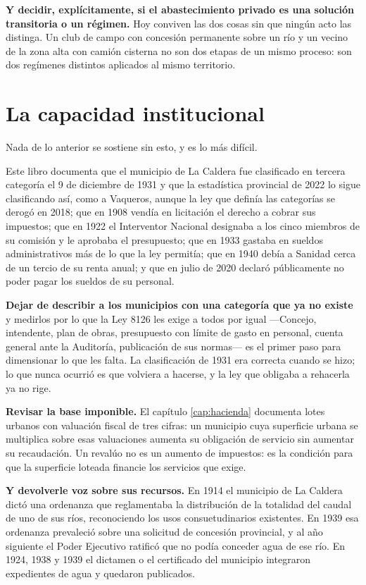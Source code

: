 \textbf{Y decidir, explícitamente, si el abastecimiento privado es una solución transitoria o un régimen.} Hoy conviven las dos cosas sin que ningún acto las distinga. Un club de campo con
concesión permanente sobre un río y un vecino de la zona alta con camión cisterna no son dos
etapas de un mismo proceso: son dos regímenes distintos aplicados al mismo territorio.

\section{La capacidad institucional}

Nada de lo anterior se sostiene sin esto, y es lo más difícil.

Este libro documenta que el municipio de La Caldera fue clasificado en tercera categoría
el 9 de diciembre de 1931 y que la estadística provincial de 2022 lo sigue clasificando así, como a Vaqueros, aunque la ley que definía las categorías se derogó en 2018; que en 1908 vendía en licitación el derecho a cobrar sus
impuestos; que en 1922 el Interventor Nacional designaba a los cinco miembros de su comisión y le
aprobaba el presupuesto; que en 1933 gastaba en sueldos administrativos más de lo que la ley
permitía; que en 1940 debía a Sanidad cerca de un tercio de su renta anual; y que en julio de
2020 declaró públicamente no poder pagar los sueldos de su personal.

\textbf{Dejar de describir a los municipios con una categoría que ya no existe} y medirlos por lo que la Ley 8126 les exige a todos por igual ---Concejo, intendente, plan de obras, presupuesto con límite de gasto en personal, cuenta general ante la Auditoría, publicación de sus normas--- es el primer paso para dimensionar lo que les falta. La clasificación de 1931 era
correcta cuando se hizo; lo que nunca ocurrió es que volviera a hacerse, y la ley que obligaba a rehacerla ya no rige.

\textbf{Revisar la base imponible.} El capítulo \ref{cap:hacienda} documenta lotes urbanos con valuación
fiscal de tres cifras: un municipio cuya superficie urbana se multiplica sobre esas
valuaciones aumenta su obligación de servicio sin aumentar su recaudación. Un revalúo no es
un aumento de impuestos: es la condición para que la superficie loteada financie los
servicios que exige.

\textbf{Y devolverle voz sobre sus recursos.} En 1914 el municipio de La Caldera dictó una
ordenanza que reglamentaba la distribución de la totalidad del caudal de uno de sus ríos,
reconociendo los usos consuetudinarios existentes. En 1939 esa ordenanza prevaleció sobre una
solicitud de concesión provincial, y al año siguiente el Poder Ejecutivo ratificó que no
podía conceder agua de ese río. En 1924, 1938 y 1939 el dictamen o el certificado del
municipio integraron expedientes de agua y quedaron publicados.

